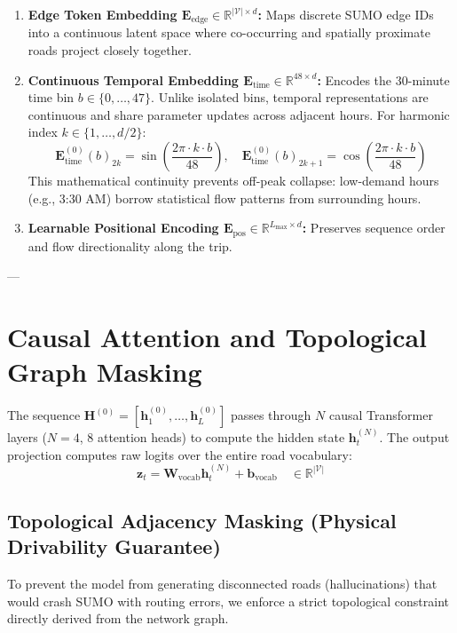 \documentclass[11pt,a4paper]{article}
\begin{document}
\begin{enumerate}[leftmargin=1.5em]
    \item \textbf{Edge Token Embedding $\mathbf{E}_{\text{edge}} \in \mathbb{R}^{|\mathcal{V}| \times d}$:} Maps discrete SUMO edge IDs into a continuous latent space where co-occurring and spatially proximate roads project closely together.
    \item \textbf{Continuous Temporal Embedding $\mathbf{E}_{\text{time}} \in \mathbb{R}^{48 \times d}$:} Encodes the 30-minute time bin $b \in \{0, \dots, 47\}$. Unlike isolated bins, temporal representations are continuous and share parameter updates across adjacent hours. For harmonic index $k \in \{1, \dots, d/2\}$:
    \begin{equation}
    \mathbf{E}_{\text{time}}^{(0)}(b)_{2k} = \sin\left(\frac{2\pi \cdot k \cdot b}{48}\right), \quad \mathbf{E}_{\text{time}}^{(0)}(b)_{2k+1} = \cos\left(\frac{2\pi \cdot k \cdot b}{48}\right)
    \end{equation}
    This mathematical continuity prevents off-peak collapse: low-demand hours (e.g., 3:30 AM) borrow statistical flow patterns from surrounding hours.
    \item \textbf{Learnable Positional Encoding $\mathbf{E}_{\text{pos}} \in \mathbb{R}^{L_{\max} \times d}$:} Preserves sequence order and flow directionality along the trip.
\end{enumerate}

---

\section{Causal Attention and Topological Graph Masking}

The sequence $\mathbf{H}^{(0)} = [\mathbf{h}_1^{(0)}, \dots, \mathbf{h}_L^{(0)}]$ passes through $N$ causal Transformer layers ($N = 4$, 8 attention heads) to compute the hidden state $\mathbf{h}_t^{(N)}$. The output projection computes raw logits over the entire road vocabulary:
\begin{equation}
\mathbf{z}_t = \mathbf{W}_{\text{vocab}} \mathbf{h}_t^{(N)} + \mathbf{b}_{\text{vocab}} \quad \in \mathbb{R}^{|\mathcal{V}|}
\end{equation}

\subsection{Topological Adjacency Masking (Physical Drivability Guarantee)}
To prevent the model from generating disconnected roads (hallucinations) that would crash SUMO with routing errors, we enforce a strict topological constraint directly derived from the network graph.
\end{document}
